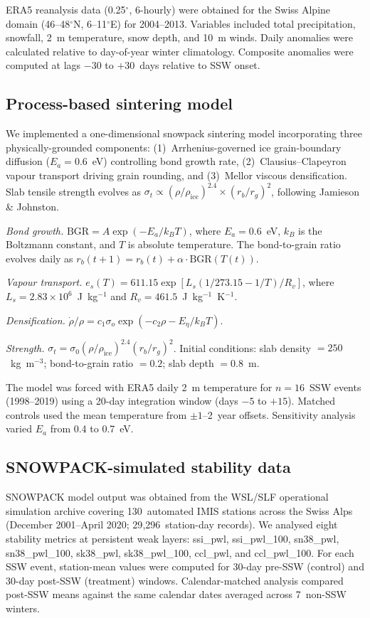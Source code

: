 \documentclass[11pt,letterpaper]{article}
\begin{document}
ERA5 reanalysis data (0.25$^\circ$, 6-hourly) were obtained for the Swiss Alpine domain (46--48$^\circ$N, 6--11$^\circ$E) for 2004--2013. Variables included total precipitation, snowfall, 2~m temperature, snow depth, and 10~m winds. Daily anomalies were calculated relative to day-of-year winter climatology. Composite anomalies were computed at lags $-30$ to $+30$~days relative to SSW onset.

\subsection{Process-based sintering model}

We implemented a one-dimensional snowpack sintering model incorporating three physically-grounded components: (1)~Arrhenius-governed ice grain-boundary diffusion ($E_a = 0.6$~eV) controlling bond growth rate, (2)~Clausius--Clapeyron vapour transport driving grain rounding, and (3)~Mellor viscous densification. Slab tensile strength evolves as $\sigma_t \propto (\rho/\rho_{\text{ice}})^{2.4} \times (r_b/r_g)^2$, following Jamieson \& Johnston.

\textit{Bond growth.} $\mathrm{BGR} = A \exp(-E_a / k_B T)$, where $E_a = 0.6$~eV, $k_B$ is the Boltzmann constant, and $T$ is absolute temperature. The bond-to-grain ratio evolves daily as $r_b(t+1) = r_b(t) + \alpha \cdot \mathrm{BGR}(T(t))$.

\textit{Vapour transport.} $e_s(T) = 611.15 \exp[L_s (1/273.15 - 1/T) / R_v]$, where $L_s = 2.83 \times 10^6$~J~kg$^{-1}$ and $R_v = 461.5$~J~kg$^{-1}$~K$^{-1}$.

\textit{Densification.} $\dot{\rho}/\rho = c_1 \sigma_o \exp(-c_2 \rho - E_\eta / k_B T)$.

\textit{Strength.} $\sigma_t = \sigma_0 (\rho / \rho_{\text{ice}})^{2.4} (r_b / r_g)^2$. Initial conditions: slab density $= 250$~kg~m$^{-3}$; bond-to-grain ratio $= 0.2$; slab depth $= 0.8$~m.

The model was forced with ERA5 daily 2~m temperature for $n = 16$~SSW events (1998--2019) using a 20-day integration window (days $-5$ to $+15$). Matched controls used the mean temperature from $\pm 1$--2~year offsets. Sensitivity analysis varied $E_a$ from 0.4 to 0.7~eV.

\subsection{SNOWPACK-simulated stability data}

SNOWPACK model output was obtained from the WSL/SLF operational simulation archive covering 130~automated IMIS stations across the Swiss Alps (December 2001--April 2020; 29{,}296~station-day records). We analysed eight stability metrics at persistent weak layers: ssi\_pwl, ssi\_pwl\_100, sn38\_pwl, sn38\_pwl\_100, sk38\_pwl, sk38\_pwl\_100, ccl\_pwl, and ccl\_pwl\_100. For each SSW event, station-mean values were computed for 30-day pre-SSW (control) and 30-day post-SSW (treatment) windows. Calendar-matched analysis compared post-SSW means against the same calendar dates averaged across 7~non-SSW winters.
\end{document}
